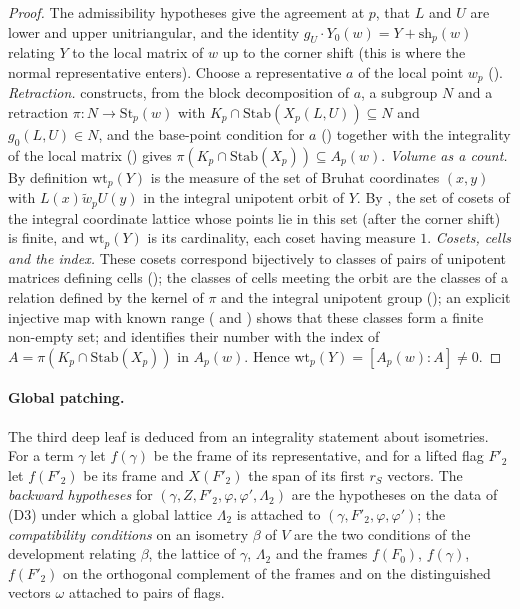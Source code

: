 \begin{proof}
The admissibility hypotheses give the agreement at $p$, that $L$ and $U$ are lower and upper unitriangular, and the identity
$g_U\cdot Y_0(w)=Y+\mathrm{sh}_p(w)$ relating $Y$ to the local matrix of $w$ up to the corner shift (this is where the normal
representative enters). Choose a representative $a$ of the local point $w_p$ ().
\emph{Retraction.}  constructs, from the block decomposition of $a$, a subgroup $N$ and a
retraction $\pi:N\to\mathrm{St}_p(w)$ with $K_p\cap\mathrm{Stab}(X_p(L,U))\subseteq N$ and $g_0(L,U)\in N$, and the base-point condition for $a$
() together with the integrality of the local matrix
() gives $\pi(K_p\cap\mathrm{Stab}(X_p))\subseteq A_p(w)$. \emph{Volume as a count.} By definition $\mathrm{wt}_p(Y)$ is the measure of the set of Bruhat coordinates $(x,y)$ with $L(x)\tilde w_pU(y)$ in
the integral unipotent orbit of $Y$. By , the set of cosets of the integral coordinate
lattice whose points lie in this set (after the corner shift) is finite, and $\mathrm{wt}_p(Y)$ is its cardinality, each coset having measure
$1$. \emph{Cosets, cells and the index.} These cosets correspond bijectively to classes of pairs of unipotent matrices defining cells
(); the classes of cells meeting the orbit are the classes of a relation defined by the kernel of
$\pi$ and the integral unipotent group (); an explicit injective map with known range
( and ) shows that these classes form a finite non-empty set;
and  identifies their number with the index of $A=\pi(K_p\cap\mathrm{Stab}(X_p))$ in
$A_p(w)$. Hence $\mathrm{wt}_p(Y)=[A_p(w):A]\ne0$.
\end{proof}

\paragraph{Global patching.} The third deep leaf is deduced from an integrality statement about isometries. For a term $\gamma$ let
$f(\gamma)$ be the frame of its representative, and for a lifted flag $F'_2$ let $f(F'_2)$ be its frame and $X(F'_2)$ the span of its first
$r_S$ vectors. The \emph{backward hypotheses} for $(\gamma,Z,F'_2,\varphi,\varphi',\Lambda_2)$ are the hypotheses on the data of (D3) under which a
global lattice $\Lambda_2$ is attached to $(\gamma,F'_2,\varphi,\varphi')$; the \emph{compatibility conditions} on an isometry $\beta$ of $V$ are the two
conditions of the development relating $\beta$, the lattice of $\gamma$, $\Lambda_2$ and the frames $f(F_0)$, $f(\gamma)$, $f(F'_2)$ on the
orthogonal complement of the frames and on the distinguished vectors $\omega$ attached to pairs of flags.

